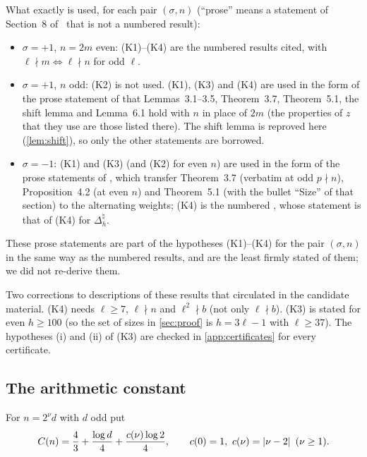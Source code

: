 What exactly is used, for each pair $(\sigma,n)$ (``prose'' means a statement of Section~8 of~\Kri{} that is not a numbered result):
\begin{itemize}
\item $\sigma=+1$, $n=2m$ even: (K1)--(K4) are the numbered results cited, with $\ell\nmid m\Leftrightarrow\ell\nmid n$
for odd $\ell$.
\item $\sigma=+1$, $n$ odd: (K2) is not used. (K1), (K3) and (K4) are used in the form of the prose statement of
\cite[Section~8.1]{Krisman2026units} that Lemmas~3.1--3.5, Theorem~3.7, Theorem~5.1, the shift lemma and Lemma~6.1
hold with $n$ in place of $2m$ (the properties of $z$ that they use are those listed there). The shift lemma is reproved here
(\cref{lem:shift}), so only the other statements are borrowed.
\item $\sigma=-1$: (K1) and (K3) (and (K2) for even $n$) are used in the form of the prose statements of
\cite[Section~8.2]{Krisman2026units}, which transfer Theorem~3.7 (verbatim at odd $p\nmid n$), Proposition~4.2 (at even $n$)
and Theorem~5.1 (with the bullet ``Size'' of that section) to the alternating weights; (K4) is the numbered
\cite[Lemma~8.6]{Krisman2026units}, whose statement is that of (K4) for $\Delta_h^{\natural}$.
\end{itemize}
These prose statements are part of the hypotheses (K1)--(K4) for the pair $(\sigma,n)$ in the same way as the numbered results,
and are the least firmly stated of them; we did not re-derive them.

\begin{remark}
Two corrections to descriptions of these results that circulated in the candidate material. (K4) needs
$\ell\ge7$, $\ell\nmid n$ and $\ell^2\nmid b$ (not only $\ell\nmid b$). (K3) is stated for even $h\ge100$
(so the set of sizes in \cref{sec:proof} is $h=3\ell-1$ with $\ell\ge37$). The hypotheses (i) and (ii) of (K3) are
checked in \cref{app:certificates} for every certificate.
\end{remark}

\subsection{The arithmetic constant}\label{subsec:constant}

For $n=2^\nu d$ with $d$ odd put
\begin{equation}\label{eq:Cn-def}
\Car(n)=\frac43+\frac{\log d}4+\frac{c(\nu)\log2}4,\qquad c(0)=1,\ c(\nu)=\abs{\nu-2}\ (\nu\ge1).
\end{equation}

